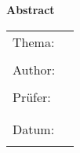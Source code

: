 
\begin{center}
{\Large \textbf{Abstract}}
\end{center}

\bigskip

\begin{center}
	\begin{tabular}{p{2.8cm}p{10cm}}
		Thema: & \thema \\
		 & \\
		Author: & \autorAbs \\
		 & \\
		Prüfer: & \prueferA  \\[.5ex]
		 &  \prueferB \\
		 & \\
		Datum: & \abgabedatum \\
		 & \\
	\end{tabular}
\end{center}

\bigskip

\noindent
\zusammenfassung